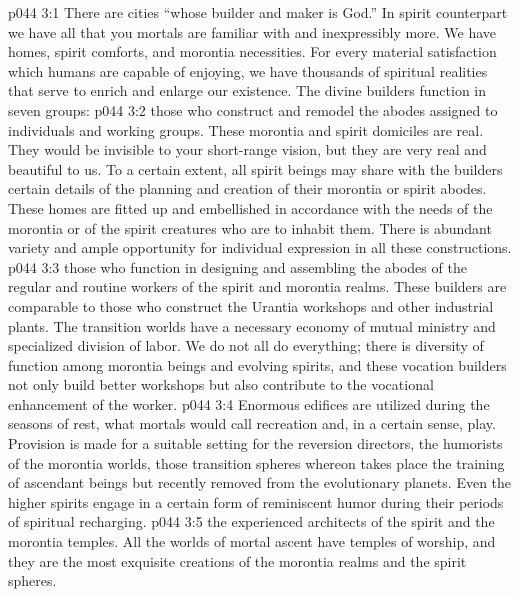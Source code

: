 \vs p044 3:1 There are cities “whose builder and maker is God.” In spirit counterpart we have all that you mortals are familiar with and inexpressibly more. We have homes, spirit comforts, and morontia necessities. For every material satisfaction which humans are capable of enjoying, we have thousands of spiritual realities that serve to enrich and enlarge our existence. The divine builders function in seven groups:\plusone
\pc \vs p044 3:2 \bibnobreakspace {}those who construct and remodel the abodes assigned to individuals and working groups. These morontia and spirit domiciles are real. They would be invisible to your short\hyp{}range vision, but they are very real and beautiful to us. To a certain extent, all spirit beings may share with the builders certain details of the planning and creation of their morontia or spirit abodes. These homes are fitted up and embellished in accordance with the needs of the morontia or of the spirit creatures who are to inhabit them. There is abundant variety and ample opportunity for individual expression in all these constructions.
\pc \vs p044 3:3 \bibnobreakspace {}those who function in designing and assembling the abodes of the regular and routine workers of the spirit and morontia realms. These builders are comparable to those who construct the Urantia workshops and other industrial plants. The transition worlds have a necessary economy of mutual ministry and specialized division of labor. We do not all do everything; there is diversity of function among morontia beings and evolving spirits, and these vocation builders not only build better workshops but also contribute to the vocational enhancement of the worker.
\pc \vs p044 3:4 \bibnobreakspace {} Enormous edifices are utilized during the seasons of rest, what mortals would call recreation and, in a certain sense, play. Provision is made for a suitable setting for the reversion directors, the humorists of the morontia worlds, those transition spheres whereon takes place the training of ascendant beings but recently removed from the evolutionary planets. Even the higher spirits engage in a certain form of reminiscent humor during their periods of spiritual recharging.
\pc \vs p044 3:5 \bibnobreakspace {}the experienced architects of the spirit and the morontia temples. All the worlds of mortal ascent have temples of worship, and they are the most exquisite creations of the morontia realms and the spirit spheres.
